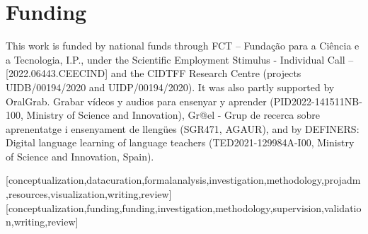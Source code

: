 \documentclass[english]{textolivre}
\begin{document}
\begin{polyabstract}
\begin{portuguese}
\begin{abstract}
\end{abstract}
\end{portuguese}
\end{polyabstract}

%
%
%
%
\section{Funding}\label{sec-funding}
This work is funded by national funds through FCT – Fundação para a Ciência e a Tecnologia, I.P., under the Scientific Employment Stimulus - Individual Call – [2022.06443.CEECIND] and the CIDTFF Research Centre (projects UIDB/00194/2020 and UIDP/00194/2020). It was also partly supported by OralGrab. Grabar vídeos y audios para ensenyar y aprender (PID2022-141511NB-100, Ministry of Science and Innovation), Gr@el - Grup de recerca sobre aprenentatge i ensenyament de llengües (SGR471, AGAUR), and by DEFINERS: Digital language learning of language teachers (TED2021-129984A-I00, Ministry of Science and Innovation, Spain).


\printbibliography
\label{sec-bib}
\begin{contributors}
[conceptualization,datacuration,formalanalysis,investigation,methodology,projadm,resources,visualization,writing,review]
[conceptualization,funding,funding,investigation,methodology,supervision,validation,writing,review]
\end{contributors}


\newpage

\end{document}
